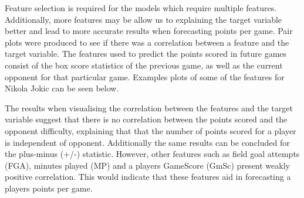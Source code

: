 \documentclass[a4paper,11pt,twoside]{article}
\begin{document}
Feature selection is required for the models which  require multiple features. Additionally, more features may be allow us to explaining the target variable better and lead to more accurate results when forecasting points per game.  Pair plots were produced to see if there was a correlation between a feature and the target variable. The features used to predict the points scored in future games consist of the box score statistics of the previous game, as well as the current opponent for that particular game. Examples plots of some of the features for Nikola Jokic can be seen below.

The results when visualising the correlation between the features and the target variable suggest that there is no correlation between the points scored and the opponent difficulty, explaining that that the number of points scored for a player is independent of opponent. Additionally the same results can be concluded for the plus-minus (+/-) statistic. However, other features such as field goal attempts (FGA), minutes played (MP) and a players GameScore (GmSc) present weakly positive correlation. This would indicate that these features aid in forecasting a players points per game. 
\end{document}
